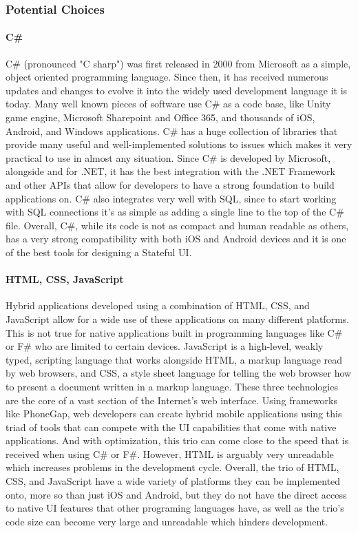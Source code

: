 \documentclass[onecolumn, draftclsnofoot,10pt, compsoc]{IEEEtran}
\begin{document}
\subsubsection{Potential Choices}
\paragraph{C\#}
C\# (pronounced "C sharp") was first released in 2000 from Microsoft as a simple, object oriented programming language. Since then, it has received numerous updates
and changes to evolve it into the widely used development language it is today. Many well known pieces of software use C\# as a code base, like Unity game engine, Microsoft Sharepoint and Office 365,
and thousands of iOS, Android, and Windows applications. C\# has a huge collection of libraries that provide many useful and well-implemented solutions to issues which makes it very practical to use
in almost any situation. Since C\# is developed by Microsoft, alongside and for .NET, it has the best integration with the .NET Framework and other APIs that allow for developers to have a strong 
foundation to build applications on. C\# also integrates very well with SQL, since to start working with SQL connections it's as simple as adding a single line to the top of the C\# file. Overall, C\#,
while its code is  not as compact and human readable as others, has a very strong compatibility with both iOS and Android devices and it is one of the  best tools for designing a Stateful UI.

\paragraph{HTML, CSS, JavaScript}
Hybrid applications developed using a combination of HTML, CSS, and JavaScript allow for a wide use of these applications on many different platforms. This is not true for native applications built in
programming languages like C\# or F\# who are limited to certain devices. JavaScript is a high-level, weakly typed, scripting language that works alongside HTML, a markup language read by web browsers, and CSS, a style sheet language
for telling the web browser how to present a document written in a markup language. These three technologies are the core of a vast section of the Internet's web interface. Using frameworks like 
PhoneGap, web developers can create hybrid mobile applications using this triad of tools that can compete with the UI capabilities that come with native applications. And with optimization, this trio 
can come close to the speed that is received when using C\# or F\#. However, HTML is arguably very unreadable which increases problems in the development cycle. Overall, the trio of  HTML, CSS, and JavaScript
have a wide variety of platforms they can be implemented onto, more so than just iOS and Android, but they do not have the direct access to native UI features that other programing languages have, as well
as the trio's code size can become very large and unreadable which hinders development.
\end{document}
